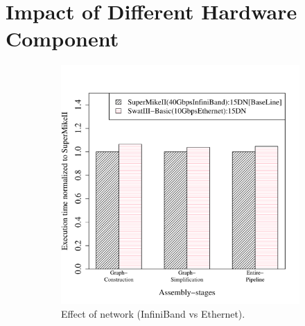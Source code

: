 \documentclass[conference]{IEEEtran}
\begin{document}
\section {Impact of Different Hardware Component} \label{IndividualImpactofDifferentHardwareConfiguration}
\begin{figure}[htb]
	\begin{subfigure}[b]{0.23\textwidth}
                \includegraphics[width=\textwidth]{Figure/PerormanceData/Plots/Network.pdf}
                \caption{Effect of network (InfiniBand vs Ethernet).}
                \label{fig:SuperMikeSwatBasic}
        \end{subfigure}
 	\begin{subfigure}[b]{0.23\textwidth}

\end{subfigure}
\end{figure}
\end{document}
